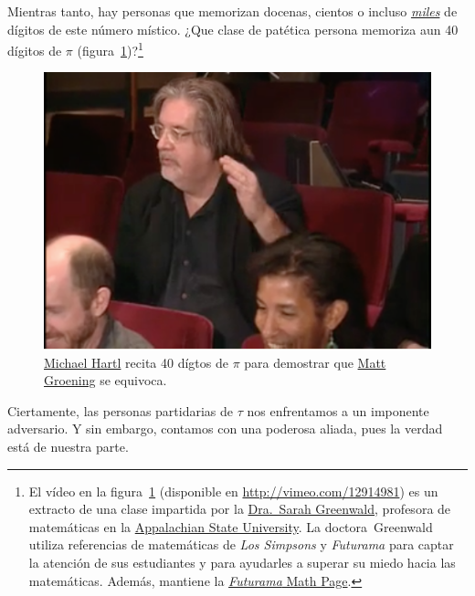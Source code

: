 Mientras tanto, hay personas que memorizan docenas, cientos o incluso  \href{http://www.pi-world-ranking-list.com/lists/details/luchaointerview.html}{\emph{miles}} de dígitos de este número místico. ¿Que clase de patética persona memoriza aun 40 dígitos de $\pi$ (figura~\ref{fig:futurama_video})?\footnote{El vídeo en la figura~\ref{fig:futurama_video} (disponible en  \href{http://vimeo.com/12914981}{http://vimeo.com/12914981}) es un extracto de una clase impartida por la \href{http://mathsci.appstate.edu/~sjg/}{Dra.\ Sarah Greenwald}, profesora de matemáticas en la \href{http://www.appstate.edu/}{Appalachian State University}. La doctora\ Greenwald utiliza referencias de matemáticas de \emph{Los Simpsons} y \emph{Futurama} para captar la atención de sus estudiantes y para ayudarles a superar su miedo hacia las matemáticas. Además, mantiene la \href{http://mathsci2.appstate.edu/~sjg/futurama/}{\emph{Futurama} Math Page}.}

\begin{figure}
\begin{center}
\includegraphics{images/figures/futurama_math_lecture.png} %
\end{center}
\caption{\href{https://tauday.com/tau-manifesto/\#sec-about_the_author}{Michael Hartl} recita 40 dígtos de $\pi$ para demostrar que \href{https://es.wikipedia.org/wiki/Matt_Groening}{Matt Groening} se equivoca.\label{fig:futurama_video}}
\end{figure}

Ciertamente, las personas partidarias de $\tau$ nos enfrentamos a un imponente adversario. Y sin embargo, contamos con una poderosa aliada, pues la verdad está de nuestra parte.

